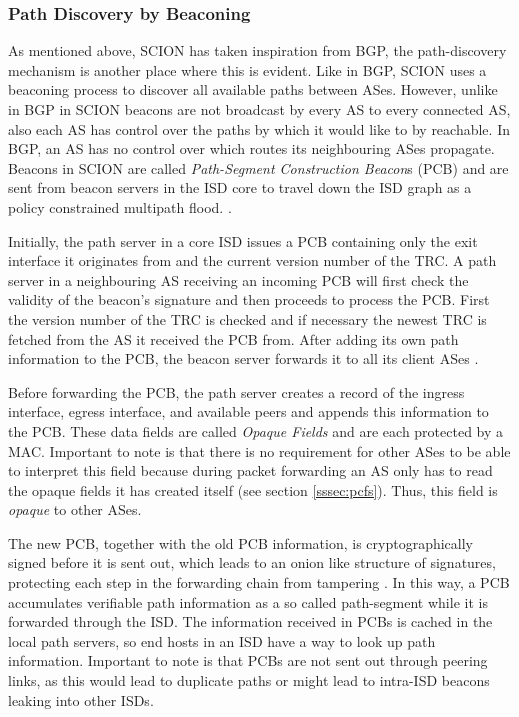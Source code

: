 \documentclass[../eva1_scion.tex]{subfiles}
\begin{document}
    \subsubsection{Path Discovery by Beaconing}\label{sssec:beaconing}
    As mentioned above, SCION has taken inspiration from BGP, the path-discovery mechanism is another place where this is evident. Like in BGP, SCION uses a beaconing process to discover all available paths between ASes. However, unlike in BGP in SCION beacons are not broadcast by every AS to every connected AS, also each AS has control over the paths by which it would like to by reachable. In BGP, an AS has no control over which routes its neighbouring ASes propagate. Beacons in SCION are called \textit{Path-Segment Construction Beacon}s (PCB) and are  sent from beacon servers in the ISD core to travel down the ISD graph as a policy constrained multipath flood. \cite{scion_2011}.

    Initially, the path server in a core ISD issues a PCB containing only the exit interface it originates from and the current version number of the TRC. A path server in a neighbouring AS receiving an incoming PCB will first check the validity of the beacon's signature and then proceeds to process the PCB. First the version number of the TRC is checked and if necessary the newest TRC is fetched  from the AS it received the PCB from. After adding its own path information to the PCB, the beacon server forwards it to all its client ASes \cite{scion_2011}.

    Before forwarding the PCB, the path server creates a record of the ingress interface, egress interface, and available peers and  appends this information to the PCB. These data fields are called \textit{Opaque Fields} and are each protected by a MAC. Important to note is that  there is no requirement for other ASes to be able to interpret this field because during packet forwarding an AS only has to read  the opaque fields it has created itself (see section \ref{sssec:pcfs}). Thus, this field is \textit{opaque} to other ASes. 

    The new PCB, together with the old PCB information, is cryptographically signed before it is sent out, which leads to an onion like structure of signatures, protecting each step in the forwarding chain from tampering \cite{scion_2011}. In this way, a PCB accumulates verifiable path information as a so called path-segment while it is forwarded through the ISD. The information received in PCBs is cached in the local path servers, so end hosts in an ISD have a way to look up path information. Important to note is that PCBs are not sent out through peering links, as this would lead to duplicate paths or might lead to intra-ISD beacons leaking into other ISDs.
\end{document}
